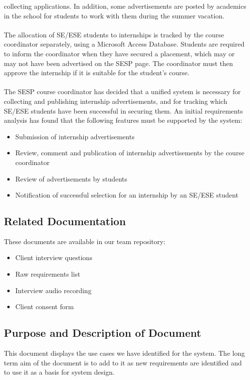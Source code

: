\documentclass{l3deliverable}
\begin{document}
collecting applications. In addition, some advertisements are posted by academics in the school for
students to work with them during the summer vacation.\\
\\
The allocation of SE/ESE students to internships is tracked by the course coordinator separately,
using a Microsoft Access Database. Students are required to inform the coordinator when they have
secured a placement, which may or may not have been advertised on the SESP page. The coordinator
must then approve the internship if it is suitable for the student's course.\\
\\
The SESP course coordinator has decided that a unified system is necessary for collecting and
publishing internship advertisements, and for tracking which SE/ESE students have been successful
in securing them. An initial requirements analysis has found that the following features must be
supported by the system:
\begin{itemize}
\item{Submission of internship advertisements}
\item{Review, comment and publication of internship advertisements by the course coordinator}
\item{Review of advertisements by students}
\item{Notification of successful selection for an internship by an SE/ESE student}
\end{itemize}


\subsection{Related Documentation}
These documents are available in our team repository:
\begin{itemize}
	\item{Client interview questions}
	\item{Raw requirements list}
	\item{Interview audio recording}
	\item{Client consent form}
\end{itemize}

\subsection{Purpose and Description of Document}
This document displays the use cases we have identified for the system. The long term aim of the document is to add to it as new requirements are identified and to use it as a basis for system design. 
\end{document}
